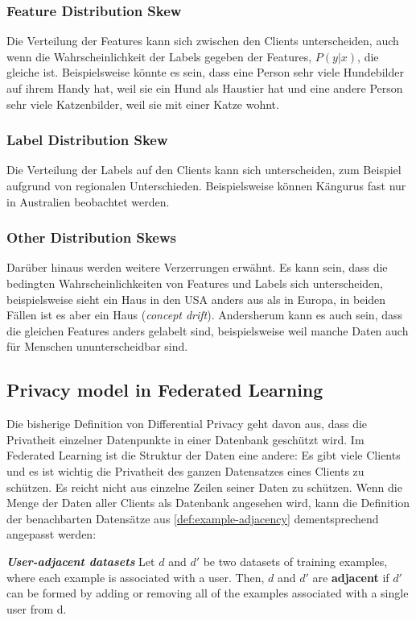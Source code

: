 \subsubsection{Feature Distribution Skew}
Die Verteilung der Features kann sich zwischen den Clients unterscheiden, auch wenn die Wahrscheinlichkeit der Labels gegeben der Features, $P(y|x)$, die gleiche ist. Beispielsweise könnte es sein, dass eine Person sehr viele Hundebilder auf ihrem Handy hat, weil sie ein Hund als Haustier hat und eine andere Person sehr viele Katzenbilder, weil sie mit einer Katze wohnt.

\subsubsection{Label Distribution Skew}
Die Verteilung der Labels auf den Clients kann sich unterscheiden, zum Beispiel aufgrund von regionalen Unterschieden. Beispielsweise können Kängurus fast nur in Australien beobachtet werden.

\subsubsection{Other Distribution Skews}
Darüber hinaus werden weitere Verzerrungen erwähnt. Es kann sein, dass die bedingten Wahrscheinlichkeiten von Features und Labels sich unterscheiden, beispielsweise sieht ein Haus in den USA anders aus als in Europa, in beiden Fällen ist es aber ein Haus (\textit{concept drift}). Andersherum kann es auch sein, dass die gleichen Features anders gelabelt sind, beispielsweise weil manche Daten auch für Menschen ununterscheidbar sind.

\subsection{Privacy model in Federated Learning}
Die bisherige Definition von Differential Privacy geht davon aus, dass die Privatheit einzelner Datenpunkte in einer Datenbank geschützt wird. Im Federated Learning ist die Struktur der Daten eine andere: Es gibt viele Clients und es ist wichtig die Privatheit des ganzen Datensatzes eines Clients zu schützen. Es reicht nicht aus einzelne Zeilen seiner Daten zu schützen. Wenn die Menge der Daten aller Clients als Datenbank angesehen wird, kann die Definition der benachbarten Datensätze aus  \autoref{def:example-adjacency} dementsprechend angepasst werden:

\begin{definition}\label{def:user-adjacency}
	\emph{\textbf{User-adjacent datasets}\cite{mcmahan:2018}} Let $d$ and $d'$ be two datasets of training examples, where each example is associated with a user. Then, $d$ and $d'$ are \textbf{adjacent} if $d'$ can be formed by adding or removing all of the examples associated with a single user from d.
\end{definition}

